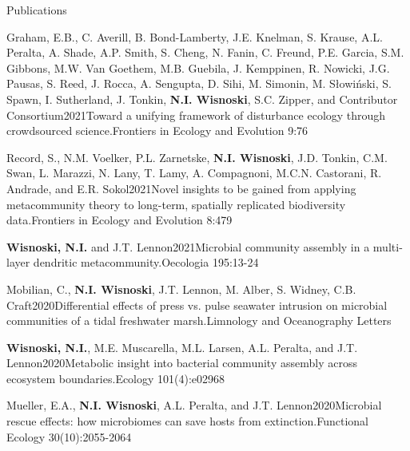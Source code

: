 \documentclass{resume} %
\begin{document}
\begin{rhangSection}{Publications}
\begin{Publication}{Graham, E.B., C. Averill, B. Bond-Lamberty, J.E. Knelman, S. Krause, A.L. Peralta, A. Shade, A.P. Smith, S. Cheng, N. Fanin, C. Freund, P.E. Garcia, S.M. Gibbons, M.W. Van Goethem, M.B. Guebila, J. Kemppinen, R. Nowicki, J.G. Pausas, S. Reed, J. Rocca, A. Sengupta, D. Sihi, M. Simonin, M. Słowiński, S. Spawn, I. Sutherland, J. Tonkin, {\bf N.I. Wisnoski}, S.C. Zipper, and Contributor Consortium}{2021}{Toward a unifying framework of disturbance ecology through crowdsourced science.}{Frontiers in Ecology and Evolution 9:76}
\end{Publication}

\begin{Publication}{Record, S., N.M. Voelker, P.L. Zarnetske, {\bf N.I. Wisnoski}, J.D. Tonkin, C.M. Swan, L. Marazzi, N. Lany, T. Lamy, A. Compagnoni, M.C.N. Castorani, R. Andrade, and E.R. Sokol}{2021}{Novel insights to be gained from applying metacommunity theory to long-term, spatially replicated biodiversity data.}{Frontiers in Ecology and Evolution 8:479}
\end{Publication}

\begin{Publication}{{\bf Wisnoski, N.I.} and J.T. Lennon}{2021}{Microbial community assembly in a multi-layer dendritic metacommunity.}{Oecologia 195:13-24}
\end{Publication}

\begin{Publication}{Mobilian, C., {\bf N.I. Wisnoski}, J.T. Lennon, M. Alber, S. Widney, C.B. Craft}{2020}{Differential effects of press vs. pulse seawater intrusion on microbial communities of a tidal freshwater marsh.}{Limnology and Oceanography Letters}
\end{Publication}

\begin{Publication}{{\bf Wisnoski, N.I.}, M.E. Muscarella, M.L. Larsen, A.L. Peralta, and J.T. Lennon}{2020}{Metabolic insight into bacterial community assembly across ecosystem boundaries.}{Ecology 101(4):e02968}
\end{Publication}

\begin{Publication}{Mueller, E.A., {\bf N.I. Wisnoski}, A.L. Peralta, and J.T. Lennon}{2020}{Microbial rescue effects: how microbiomes can save hosts from extinction.}{Functional Ecology 30(10):2055-2064}
\end{Publication}


\end{rhangSection}
\end{document}
